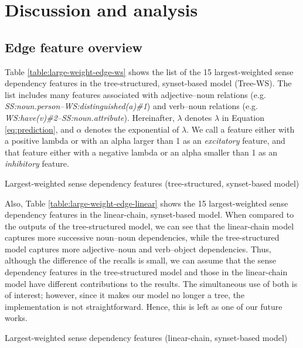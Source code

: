 \documentclass[english]{jnlp_1.4}
\begin{document}
\section{Discussion and analysis}
\label{section:discussion}

\subsection{Edge feature overview}

Table \ref{table:large-weight-edge-ws} shows the list of the 15 largest-weighted sense dependency features in the tree-structured, synset-based model (Tree-WS).
The list includes many features associated with adjective--noun relations (e.g. \textit{SS:noun.person--WS:distinguished(a)\#1}) and verb--noun relations (e.g. \textit{WS:have(v)\#2--SS:noun.attribute}).
Hereinafter, $\lambda$ denotes $\lambda$ in Equation \ref{eq:prediction}, and $\alpha$ denotes the exponential of $\lambda$.
We call a feature either with a positive lambda or with an alpha larger than 1 as an \textit{excitatory} feature, and that feature either with a negative lambda or an alpha smaller than 1 as an \textit{inhibitory} feature.


\begin{table}[b]
\caption{Largest-weighted sense dependency features (tree-structured, synset-based model)}
\label{table:large-weight-edge-ws}

\end{table}

Also, Table \ref{table:large-weight-edge-linear} shows the 15 largest-weighted sense dependency features in the linear-chain, synset-based model.
When compared to the outputs of the tree-structured model, we can see that the linear-chain model captures more successive noun--noun dependencies, while the tree-structured model captures more adjective--noun and verb--object dependencies.
Thus, although the difference of the recalls is small, we can assume that the sense dependency features in the tree-structured model and those in the linear-chain model have different contributions to the results.
The simultaneous use of both is of interest; however, since it makes our model no longer a tree, the implementation is not straightforward.
Hence, this is left as one of our future works.

\begin{table}[t]
\caption{Largest-weighted sense dependency features (linear-chain, synset-based model)}
\label{table:large-weight-edge-linear}

\end{table}
\end{document}
